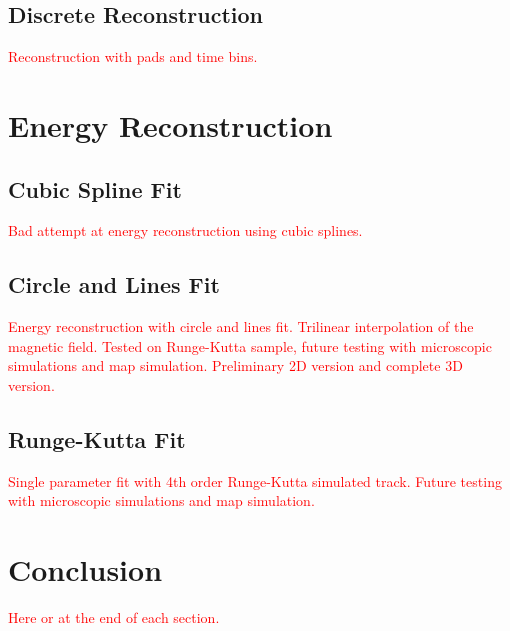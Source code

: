 \documentclass[]{article}
\begin{document}
		\subsection{Discrete Reconstruction}
			\textcolor{red}{Reconstruction with pads and time bins.}
			
	\section{Energy Reconstruction}
		
		\subsection{Cubic Spline Fit}
			\textcolor{red}{Bad attempt at energy reconstruction using cubic splines.}
		
		\subsection{Circle and Lines Fit}
			\textcolor{red}{Energy reconstruction with circle and lines fit. Trilinear interpolation of the magnetic field. Tested on Runge-Kutta sample, future testing with microscopic simulations and map simulation. Preliminary 2D version and complete 3D version.}
		
		\subsection{Runge-Kutta Fit}
			\textcolor{red}{Single parameter fit with 4th order Runge-Kutta simulated track. Future testing with microscopic simulations and map simulation.}
		
	\section{Conclusion}
		\textcolor{red}{Here or at the end of each section.}
		
	
	
	
	
\end{document}
